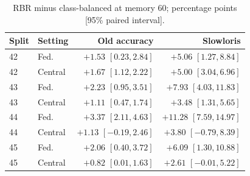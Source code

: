 \begin{table}[t]
\centering
\caption{RBR minus class-balanced at memory 60; percentage points [95\% paired interval].}
\label{tab:splits}
\footnotesize
\setlength{\tabcolsep}{3pt}
\begin{tabular}{llrr}
\toprule
Split & Setting & Old accuracy & Slowloris\\
\midrule
42 & Fed. & $+1.53$ $[0.23,2.84]$ & $+5.06$ $[1.27,8.84]$\\
42 & Central & $+1.67$ $[1.12,2.22]$ & $+5.00$ $[3.04,6.96]$\\
43 & Fed. & $+2.23$ $[0.95,3.51]$ & $+7.93$ $[4.03,11.83]$\\
43 & Central & $+1.11$ $[0.47,1.74]$ & $+3.48$ $[1.31,5.65]$\\
44 & Fed. & $+3.37$ $[2.11,4.63]$ & $+11.28$ $[7.59,14.97]$\\
44 & Central & $+1.13$ $[-0.19,2.46]$ & $+3.80$ $[-0.79,8.39]$\\
45 & Fed. & $+2.06$ $[0.40,3.72]$ & $+6.09$ $[1.30,10.88]$\\
45 & Central & $+0.82$ $[0.01,1.63]$ & $+2.61$ $[-0.01,5.22]$\\
\bottomrule
\end{tabular}
\end{table}
